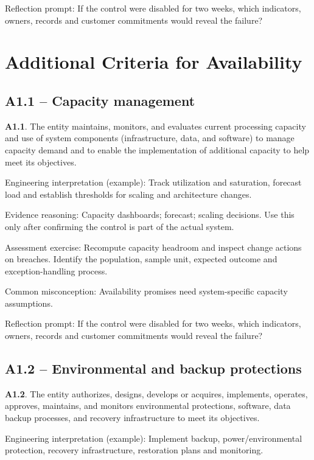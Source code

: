 \documentclass[10pt,oneside]{report}
\begin{document}
Reflection prompt: If the control were disabled for two weeks, which indicators, owners, records and customer commitments would reveal the failure?

\section{Additional Criteria for Availability}
\subsection{A1.1 -- Capacity management}
\begin{aicpabox}
\textbf{A1.1}. The entity maintains, monitors, and evaluates current processing capacity and use of system components (infrastructure, data, and software) to manage capacity demand and to enable the implementation of additional capacity to help meet its objectives.\par{}
\end{aicpabox}
Engineering interpretation (example): Track utilization and saturation, forecast load and establish thresholds for scaling and architecture changes.

Evidence reasoning: Capacity dashboards; forecast; scaling decisions. Use this only after confirming the control is part of the actual system.

Assessment exercise: Recompute capacity headroom and inspect change actions on breaches. Identify the population, sample unit, expected outcome and exception-handling process.

Common misconception: Availability promises need system-specific capacity assumptions.

Reflection prompt: If the control were disabled for two weeks, which indicators, owners, records and customer commitments would reveal the failure?

\subsection{A1.2 -- Environmental and backup protections}
\begin{aicpabox}
\textbf{A1.2}. The entity authorizes, designs, develops or acquires, implements, operates, approves, maintains, and monitors environmental protections, software, data backup processes, and recovery infrastructure to meet its objectives.\par{}
\end{aicpabox}
Engineering interpretation (example): Implement backup, power/environmental protection, recovery infrastructure, restoration plans and monitoring.
\end{document}
